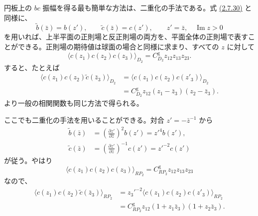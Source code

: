 
円板上の $bc$ 振幅を得る最も簡単な方法は、二重化の手法である。式 \hyperref[eq:2.7.30]{(2.7.30)} と同様に、
\begin{equation}
\widetilde b(\bar z)=b(z'),\qquad \widetilde c(\bar z)=c(z'),
\qquad z'=\bar z,\quad\operatorname{Im}z>0
\tag{6.3.9}\label{eq:6.3.9}
\end{equation}
を用いれば、上半平面の正則場と反正則場の両方を、平面全体の正則場で表すことができる。正則場の期待値は球面の場合と同様に求まり、すべての $z$ に対して
\begin{equation}
\langle c(z_1)c(z_2)c(z_3)\rangle_{D_2}=C_{D_2}^{\mathrm g}z_{12}z_{13}z_{23}.
\tag{6.3.10}\label{eq:6.3.10}
\end{equation}
すると、たとえば
\begin{equation}
\begin{aligned}
\langle c(z_1)c(z_2)\widetilde c(\bar z_3)\rangle_{D_2}
&=\langle c(z_1)c(z_2)c(z'_3)\rangle_{D_2}\\
&=C_{D_2}^{\mathrm g}z_{12}(z_1-\bar z_3)(z_2-\bar z_3).
\end{aligned}
\tag{6.3.11}\label{eq:6.3.11}
\end{equation}
より一般の相関関数も同じ方法で得られる。


ここでも二重化の手法を用いることができる。対合 $z'=-\bar z^{-1}$ から
\begin{equation}
\begin{aligned}
\widetilde b(\bar z)&=\left(\frac{\partial z'}{\partial\bar z}\right)^2b(z')=z'^4b(z'),\\
\widetilde c(\bar z)&=\left(\frac{\partial z'}{\partial\bar z}\right)^{-1}c(z')=z'^{-2}c(z')
\end{aligned}
\tag{6.3.12}\label{eq:6.3.12}
\end{equation}
が従う。やはり
\begin{equation}
\langle c(z_1)c(z_2)c(z_3)\rangle_{RP_2}=C_{RP_2}^{\mathrm g}z_{12}z_{13}z_{23}
\tag{6.3.13}\label{eq:6.3.13}
\end{equation}
なので、
\begin{equation}
\begin{aligned}
\langle c(z_1)c(z_2)\widetilde c(\bar z_3)\rangle_{RP_2}
&=z_3'^{-2}\langle c(z_1)c(z_2)c(z'_3)\rangle_{RP_2}\\
&=C_{RP_2}^{\mathrm g}z_{12}(1+z_1\bar z_3)(1+z_2\bar z_3).
\end{aligned}
\tag{6.3.14}\label{eq:6.3.14}
\end{equation}

